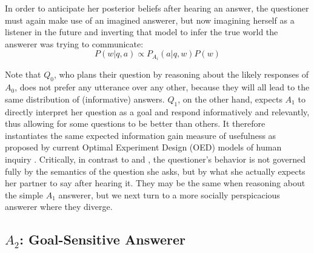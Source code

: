\documentclass[12pt, floatsintext, jou]{apa6}
\newcommand{\ndg}[1]{\textcolor{Green}{[ndg: #1]}}
\begin{document}
In order to anticipate her posterior beliefs after hearing an answer, the questioner must again make use of an imagined answerer, but now imagining herself as a listener in the future and inverting that model to infer the true world the answerer was trying to communicate:
$$P(w|q,a) \propto P_{A_i}(a| q, w)P(w)$$

Note that $Q_0$, who plans their question by reasoning about the likely responses of $A_0$, does not prefer any utterance over any other, because they will all lead to the same distribution of (informative) answers. $Q_1$, on the other hand, expects $A_1$ to directly interpret her question as a goal and respond informatively and relevantly, thus allowing for some questions to be better than others. It therefore instantiates the same expected information gain measure of usefulness as proposed by current Optimal Experiment Design (OED) models of human inquiry \cite{coenen2018asking}. Critically, in contrast to  and , the questioner's behavior is not governed fully by the semantics of the question she asks, but by what she actually expects her partner to say after hearing it. They may be the same when reasoning about the simple $A_1$ answerer, but we next turn to a more socially perspicacious answerer where they diverge.

\subsection{$A_2$: Goal-Sensitive Answerer}

%

\end{document}
